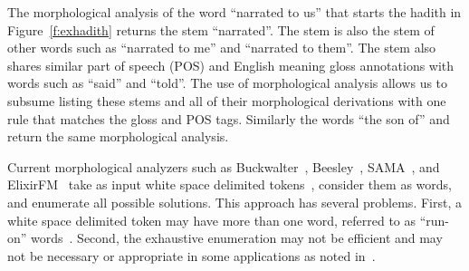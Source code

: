 \documentclass[11pt]{article}
\begin{document}
The morphological analysis of the word  
``narrated to us'' that starts the hadith in Figure~\ref{f:exhadith}
returns the stem  ``narrated''.
The stem   is also the stem of other 
words such as  ``narrated to me'' and  ``narrated to them''.
The stem also shares similar part of speech (POS)
and English meaning gloss annotations with words
such as  ``said'' and  ``told''. 
The use of morphological analysis allows us to 
subsume listing these stems and all of their morphological
derivations with one rule that matches the gloss and 
POS tags. 
Similarly the words  ``the son of'' and  
return the same morphological analysis.
         


\novocalize

Current morphological analyzers such as 
Buckwalter~,
Beesley~,
SAMA~\cite{Kulick:10},
and ElixirFM~\cite{Otakar:07} 
take as input white space delimited tokens~\cite{Kulick:10},
consider them as words,
and enumerate all possible solutions. 
This approach has several problems. 
First, a white space delimited token may have 
more than one word, referred to as ``run-on'' 
words~\cite{Buckwalter:04}.
Second, the exhaustive enumeration may not be efficient and may
not be necessary or appropriate
in some applications as noted in~\cite{Maamouri:10}. 
\end{document}
